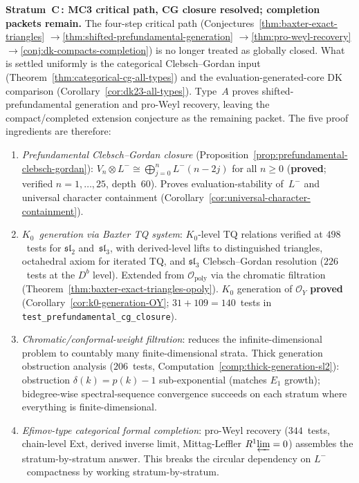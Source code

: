 \begin{remark}
\smallskip\noindent
\textbf{Stratum~C\,: MC3 critical path, CG closure resolved; completion packets remain.}
The four-step critical path
(Conjectures~\ref{thm:baxter-exact-triangles}%
$\to$\ref{thm:shifted-prefundamental-generation}%
$\to$\ref{thm:pro-weyl-recovery}%
$\to$\ref{conj:dk-compacts-completion})
is no longer treated as globally closed. What is settled uniformly is
the categorical Clebsch--Gordan input
\textup{(}Theorem~\ref{thm:categorical-cg-all-types}\textup{)} and the
evaluation-generated-core DK comparison
\textup{(}Corollary~\ref{cor:dk23-all-types}\textup{)}. Type~$A$
proves shifted-prefundamental generation and pro-Weyl
recovery, leaving the compact/completed extension conjecture as the
remaining packet. The five proof ingredients are therefore:
\begin{enumerate}[label=\textup{(\roman*)},nosep]
\item \emph{Prefundamental Clebsch--Gordan closure}
 (Proposition~\ref{prop:prefundamental-clebsch-gordan}):
 $V_n \otimes L^- \cong \bigoplus_{j=0}^{n} L^-(n-2j)$
 for all $n \ge 0$ (\textbf{proved}; verified
 $n = 1,\ldots,25$, depth~$60$).
 Proves evaluation-stability of~$L^-$
 and universal character containment
 (Corollary~\ref{cor:universal-character-containment}).

\item \emph{$K_0$~generation via Baxter TQ system}:
 $K_0$-level TQ relations verified at
 $498$~tests for $\mathfrak{sl}_2$ and~$\mathfrak{sl}_3$, with
 derived-level lifts to distinguished triangles, octahedral axiom
 for iterated TQ, and $\mathfrak{sl}_3$ Clebsch--Gordan resolution
 ($226$~tests at the $D^b$ level).
 Extended from $\mathcal{O}_{\mathrm{poly}}$ via the chromatic
 filtration (Theorem~\ref{thm:baxter-exact-triangles-opoly}).
 $K_0$ generation of $\mathcal{O}_Y$ \textbf{proved}
 (Corollary~\ref{cor:k0-generation-OY}; $31 + 109 = 140$~tests
 in \texttt{test\_prefundamental\_cg\_closure}).

\item \emph{Chromatic/conformal-weight filtration}: reduces the
 infinite-dimensional problem to countably many finite-dimensional
 strata. Thick generation obstruction analysis ($206$~tests,
 Computation~\ref{comp:thick-generation-sl2}):
 obstruction $\delta(k) = p(k)-1$ sub-exponential
 (matches $E_1$ growth); bidegree-wise spectral-sequence
 convergence succeeds on each stratum where everything is
 finite-dimensional.

\item \emph{Efimov-type categorical formal completion}: pro-Weyl
 recovery ($344$~tests, chain-level Ext, derived inverse limit,
 Mittag-Leffler $R^1\!\varprojlim = 0$) assembles the
 stratum-by-stratum answer. This breaks the circular dependency
 on $L^-$~compactness by working stratum-by-stratum.


\end{enumerate}
\end{remark}
